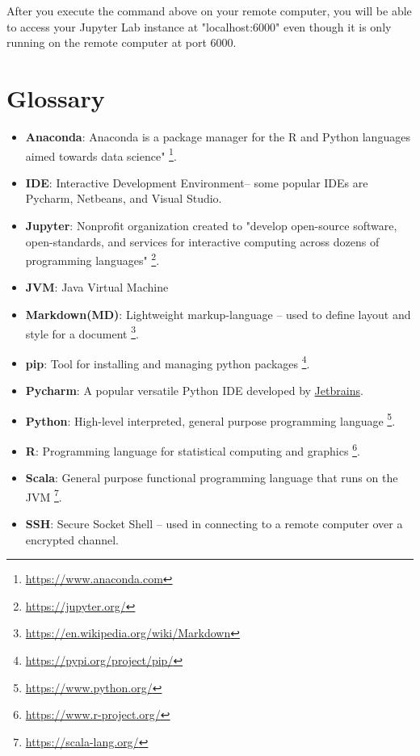 \documentclass[pdftex,12pt]{artikel3}
\begin{document}
After you execute the command above on your remote computer, you
will be able to access your Jupyter Lab instance at "localhost:6000" even though it is only running on the remote computer at port 6000.

\newpage

\section{Glossary}

\begin{itemize}[label={}]
\item {\bf Anaconda}: Anaconda is a package manager for the R and Python languages aimed towards data science" \footnote{\url{ https://www.anaconda.com}}.\\
\item {\bf IDE}: Interactive Development Environment-- some popular IDEs are Pycharm, Netbeans, and Visual Studio.\\
\item {\bf Jupyter}: Nonprofit organization created to "develop open-source software, open-standards, and services for interactive computing across dozens of programming languages" \footnote{\url{ https://jupyter.org/}}.\\
\item {\bf JVM}: Java Virtual Machine\\
\item {\bf Markdown(MD)}: Lightweight markup-language -- used to define layout and style for a document  \footnote{\url{https://en.wikipedia.org/wiki/Markdown}}.\\
\item {\bf pip}: Tool for installing and managing python packages \footnote{\url{ https://pypi.org/project/pip/}}.\\
\item {\bf Pycharm}: A popular versatile Python IDE developed by \href{https://www.jetbrains.com/}{Jetbrains}.\\
\item {\bf Python}: High-level interpreted, general purpose programming language \footnote{\url{ https://www.python.org/}}.\\
\item {\bf R}: Programming language for statistical computing and graphics \footnote{\url{ https://www.r-project.org/}}.\\
\item {\bf Scala}: General purpose functional programming language that runs on the JVM \footnote{\url{ https://scala-lang.org/}}.\\
\item {\bf SSH}: Secure Socket Shell -- used in connecting to a remote computer over a encrypted channel.\\

\end{itemize}
\end{document}

